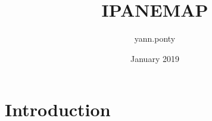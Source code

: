 \documentclass{article}
\title{IPANEMAP}
\author{yann.ponty }
\date{January 2019}
\begin{document}
\maketitle

\section{Introduction}
\end{document}
